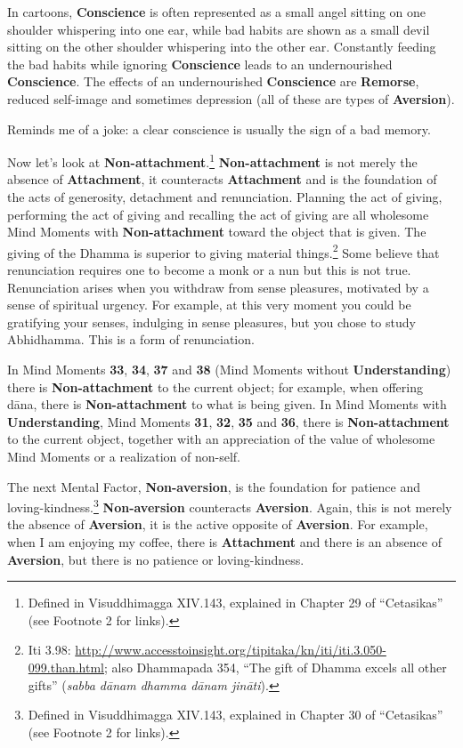 In cartoons, \textbf{Conscience} is often represented as a small angel sitting on one shoulder whispering into one ear, while bad habits are shown as a small devil sitting on the other shoulder whispering into the other ear. Constantly feeding the bad habits while ignoring \textbf{Conscience} leads to an undernourished \textbf{Conscience}. The effects of an undernourished \textbf{Conscience} are \textbf{Remorse}, reduced self-image and sometimes depression (all of these are types of \textbf{Aversion}). 

Reminds me of a joke: a clear conscience is usually the sign of a bad memory.

Now let’s look at \textbf{Non-attachment}.\footnote{Defined in Visuddhimagga XIV.143, explained in Chapter 29 of “Cetasikas” (see Footnote 2 for links).} \textbf{Non-attachment} is not merely the absence of \textbf{Attachment}, it counteracts \textbf{Attachment} and is the foundation of the acts of generosity, detachment and renunciation. Planning the act of giving, performing the act of giving and recalling the act of giving are all wholesome Mind Moments with \textbf{Non-attachment} toward the object that is given. The giving of the Dhamma is superior to giving material things.\footnote{Iti 3.98: \url{http://www.accesstoinsight.org/tipitaka/kn/iti/iti.3.050-099.than.html}; also Dhammapada 354, “The gift of Dhamma excels all other gifts” (\textit{sabba dānam dhamma dānam jināti}).} Some believe that renunciation requires one to become a monk or a nun but this is not true. Renunciation arises when you withdraw from sense pleasures, motivated by a sense of spiritual urgency. For example, at this very moment you could be gratifying your senses, indulging in sense pleasures, but you chose to study Abhidhamma. This is a form of renunciation.

In Mind Moments \textbf{33}, \textbf{34}, \textbf{37} and \textbf{38} (Mind Moments without \textbf{Understanding}) there is \textbf{Non-attachment} to the current object; for example, when offering dāna, there is \textbf{Non-attachment} to what is being given. In Mind Moments with \textbf{Understanding}, Mind Moments \textbf{31}, \textbf{32}, \textbf{35} and \textbf{36}, there is \textbf{Non-attachment} to the current object, together with an appreciation of the value of wholesome Mind Moments or a realization of non-self.

The next Mental Factor, \textbf{Non-aversion}, is the foundation for patience and loving-kindness.\footnote{Defined in Visuddhimagga XIV.143, explained in Chapter 30 of “Cetasikas” (see Footnote 2 for links).} \textbf{Non-aversion} counteracts \textbf{Aversion}. Again, this is not merely the absence of \textbf{Aversion}, it is the active opposite of \textbf{Aversion}. For example, when I am enjoying my coffee, there is \textbf{Attachment} and there is an absence of \textbf{Aversion}, but there is no patience or loving-kindness.

